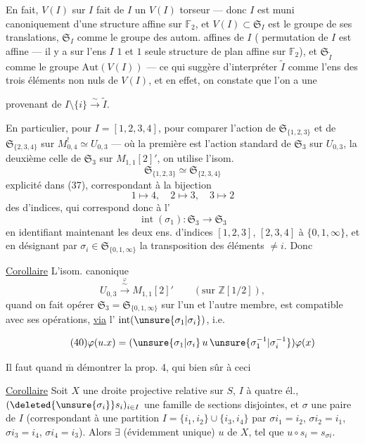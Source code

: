 En fait, $V(I)$  sur $I$ fait de $I$
un $V(I)$ torseur --- donc $I$ est muni canoniquement
d'une structure   affine sur $\mathbb{F}_2$,
et $V(I)\subset\mathfrak{S}_I$ est le groupe de ses
translations, $\mathfrak{S}_I$  comme le
groupe des autom. affines de $I$ (\uline{} permutation
de $I$ est affine --- il  y a sur l'ens
$I$ $1$ et $1$ seule structure de plan affine sur
$\mathbb{F}_2$), et $\mathfrak{S}_{\widetilde I}$ comme le groupe $\mathrm{Aut}(V(I))$
--- ce qui suggère d'interpréter $\widetilde I$ comme
l'ens des trois éléments non nuls de $V(I)$, et
en effet, on constate que  l'on a une

provenant de $I\setminus\{i\}\xrightarrow{\sim}\widetilde I$.

En particulier, pour $I=[1,2,3,4]$, pour
comparer l'action de $\mathfrak{S}_{\{1,2,3\}}$ et de
$\mathfrak{S}_{\{2,3,4\}}$ sur $M_{0,4}^{!}\simeq U_{0,3}$ --- où la première
est l'action standard de $\mathfrak{S}_3$ sur $U_{0,3}$,
la deuxième celle de $\mathfrak{S}_3$ sur $M_{1,1}[2]'$,
on utilise l'isom.
\[
\tag{38}
\mathfrak{S}_{\{1,2,3\}}\simeq\mathfrak{S}_{\{2,3,4\}}
\]
explicité dans (37), correspondant à la
bijection
\[
1\mapsto4,\quad 2\mapsto3,\quad 3\mapsto2
\]
des  d'indices, qui correspond donc
à l'
\[
\tag{39}
\operatorname{int}(\sigma_1):\mathfrak{S}_3\longrightarrow\mathfrak{S}_3
\]
en identifiant maintenant les deux ens.
d'indices $[1,2,3]$, $[2,3,4]$ à $\{0,1,\infty\}$,
et en désignant par $\sigma_i\in\mathfrak{S}_{\{0,1,\infty\}}$
 la
transposition des éléments $\ne i$. Donc

\uline{Corollaire} L'isom. canonique
\[
U_{0,3}\xrightarrow{\overset{\varphi}{\sim}}M_{1,1}[2]'
\qquad (\text{sur }\mathbb Z[1/2]),
\]
quand on fait opérer $\mathfrak{S}_3=\mathfrak{S}_{\{0,1,\infty\}}$ sur
l'un et l'autre membre, est compatible
avec ses opérations, \uline{via} l' $\operatorname{int}(\unsure{\sigma_1|\sigma_i})$, i.e.

\[
\tag{40}
\varphi(u.x)=(\unsure{\sigma_1|\sigma_i}\,u\,\unsure{\sigma_1^{-1}|\sigma_i^{-1}})\varphi(x)
\]

Il faut quand $\overline{\mathrm m}$ démontrer la prop. 4,
qui  bien sûr à ceci

\uline{Corollaire} Soit $X$ une droite projective
relative sur  $S$, $I$  à quatre él.,
$(\deleted{\unsure{\sigma_i}}s_i)_{i\in I}$ une famille de sections 
disjointes, et $\sigma$ une  paire de
$I$ (correspondant à une partition $I=\{i_1,i_2\}\cup\{i_3,i_4\}$
par $\sigma i_1=i_2$, $\sigma i_2=i_1$, $\sigma i_3=i_4$, $\sigma i_4=i_3$). Alors $\exists$
 (évidemment unique) $u$ de $X$,
tel que $u\circ s_i=s_{\sigma i}$.

